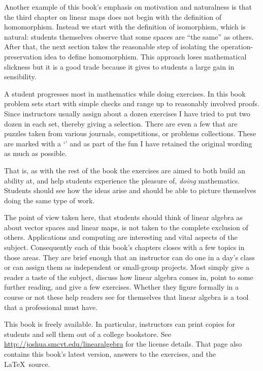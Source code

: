 {Another example of this book's emphasis on motivation and naturalness
is that the third chapter on linear maps
does not begin with the definition of homomorphism.
Instead we start with the definition of isomorphism, which
is natural: students themselves
observe that some spaces are ``the same'' as others.
After that,
the next section takes the reasonable step of 
isolating the operation-preservation idea
to define homomorphism.
This approach loses mathematical slickness 
but it is a good trade because it gives to students
a large gain in sensibility.

A student progresses most in mathematics while doing exercises. 
In this book problem sets start with 
simple checks and range up to reasonably involved proofs.
Since instructors usually assign about a dozen exercises
I have tried to put two dozen in each set, 
thereby giving a selection.
There are even a few that are puzzles
taken from various journals, competitions, or
problems collections. 
These are marked with a
`\puzzlemark' and 
as part of the fun I have retained the original wording
as much as possible.

That is, as with the rest of the book 
the exercises are aimed to both build an ability at,
and help students experience the pleasure of, 
\emph{doing} mathematics.
Students should see how the ideas arise and should be able to 
picture themselves doing the same type of work.


\medskip
{}
The point of view taken here, that students should think of 
linear algebra as about vector spaces
and linear maps, is not taken to the complete exclusion of others.
Applications and computing are interesting and vital aspects 
of the subject.
Consequently each of this book's chapters closes with a few 
topics in those areas.
They are brief enough that an instructor can do one
in a day's class 
or can assign them as independent or small-group projects.
Most simply give a reader
a taste of the subject, discuss how linear algebra comes in,
point to some further reading, and give a few exercises. 
Whether they figure formally in a course or not these help
readers see for themselves that linear algebra is a tool
that a professional must have. 




\medskip
{}
This book is freely available.
In particular, instructors can print copies for students 
and sell them out of a college bookstore.
See 
\url{http://joshua.smcvt.edu/linearalgebra}
for the license details.
That page also contains this book's latest version,
answers to the exercises, and the \LaTeX\ source.

}
